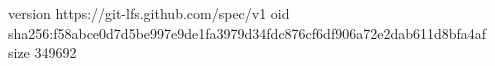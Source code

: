 version https://git-lfs.github.com/spec/v1
oid sha256:f58abce0d7d5be997e9de1fa3979d34fdc876cf6df906a72e2dab611d8bfa4af
size 349692
